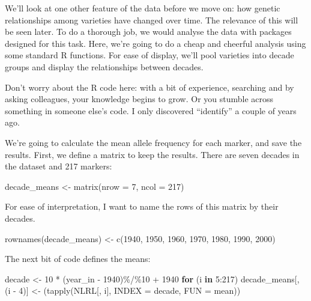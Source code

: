 \documentclass[
]{book}
\newenvironment{Shaded}{\begin{snugshade}}{\end{snugshade}}
\newcommand{\AttributeTok}[1]{\textcolor[rgb]{0.77,0.63,0.00}{#1}}
\newcommand{\ControlFlowTok}[1]{\textcolor[rgb]{0.13,0.29,0.53}{\textbf{#1}}}
\newcommand{\DecValTok}[1]{\textcolor[rgb]{0.00,0.00,0.81}{#1}}
\newcommand{\FunctionTok}[1]{\textcolor[rgb]{0.00,0.00,0.00}{#1}}
\newcommand{\NormalTok}[1]{#1}
\newcommand{\OtherTok}[1]{\textcolor[rgb]{0.56,0.35,0.01}{#1}}
\newcommand{\SpecialCharTok}[1]{\textcolor[rgb]{0.00,0.00,0.00}{#1}}
\begin{document}
We'll look at one other feature of the data before we move on: how genetic relationships
among varieties have changed over time. The relevance of this will be seen later. To do a thorough job, we would analyse the data with packages designed for this task. Here, we're going to do a cheap and cheerful analysis using some standard R functions. For ease of
display, we'll pool varieties into decade groups and display the relationships between
decades.

Don't worry about the R code here: with a bit of experience, searching and by asking
colleagues, your knowledge begins to grow. Or you stumble across something in someone else's code. I only discovered ``identify'' a couple of years ago.

We're going to calculate the mean allele frequency for each marker, and save the results.
First, we define a matrix to keep the results. There are seven decades in the dataset and 217
markers:

\begin{Shaded}
\begin{Highlighting}[]
\NormalTok{decade\_means }\OtherTok{\textless{}{-}} \FunctionTok{matrix}\NormalTok{(}\AttributeTok{nrow =} \DecValTok{7}\NormalTok{, }\AttributeTok{ncol =} \DecValTok{217}\NormalTok{)}
\end{Highlighting}
\end{Shaded}

For ease of interpretation, I want to name the rows of this matrix by their decades.

\begin{Shaded}
\begin{Highlighting}[]
\FunctionTok{rownames}\NormalTok{(decade\_means) }\OtherTok{\textless{}{-}} \FunctionTok{c}\NormalTok{(}\DecValTok{1940}\NormalTok{, }\DecValTok{1950}\NormalTok{, }\DecValTok{1960}\NormalTok{, }\DecValTok{1970}\NormalTok{, }\DecValTok{1980}\NormalTok{, }\DecValTok{1990}\NormalTok{, }
    \DecValTok{2000}\NormalTok{)}
\end{Highlighting}
\end{Shaded}

The next bit of code defines the means:

\begin{Shaded}
\begin{Highlighting}[]
\NormalTok{decade }\OtherTok{\textless{}{-}} \DecValTok{10} \SpecialCharTok{*}\NormalTok{ (year\_in }\SpecialCharTok{{-}} \DecValTok{1940}\NormalTok{)}\SpecialCharTok{\%/\%}\DecValTok{10} \SpecialCharTok{+} \DecValTok{1940}
\ControlFlowTok{for}\NormalTok{ (i }\ControlFlowTok{in} \DecValTok{5}\SpecialCharTok{:}\DecValTok{217}\NormalTok{) decade\_means[, (i }\SpecialCharTok{{-}} \DecValTok{4}\NormalTok{)] }\OtherTok{\textless{}{-}}\NormalTok{ (}\FunctionTok{tapply}\NormalTok{(NLRL[, i], }
    \AttributeTok{INDEX =}\NormalTok{ decade, }\AttributeTok{FUN =}\NormalTok{ mean))}
\end{Highlighting}
\end{Shaded}
\end{document}
